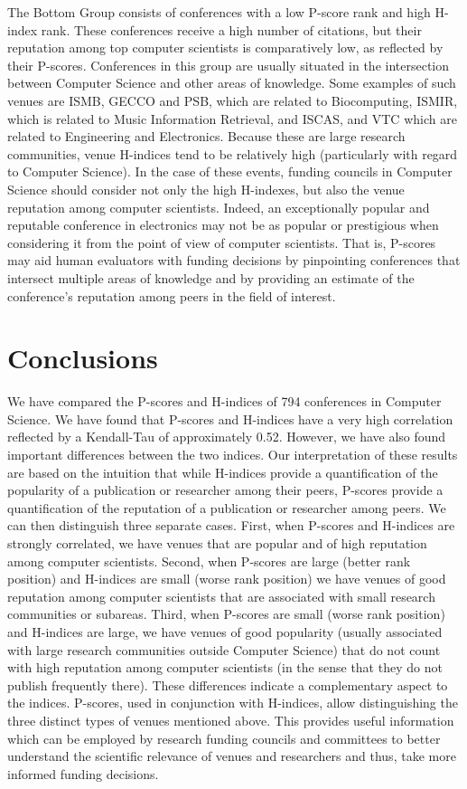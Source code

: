 \documentclass[notitlepage]{svjour3}
\begin{document}
The Bottom Group consists of conferences with a low P-score rank and high H-index rank. These conferences
receive a high number of citations, but their reputation among top computer scientists is comparatively low, as reflected by their P-scores. Conferences in this
group are usually situated in the intersection between Computer Science and other areas of knowledge. Some examples of such venues are
ISMB, GECCO and PSB, which are related to Biocomputing, ISMIR, which is related to Music Information Retrieval, and
ISCAS, and VTC which are related to Engineering and Electronics. Because these are large research communities, venue H-indices tend to be 
relatively high (particularly with regard to Computer Science). In the case of these events, funding councils in Computer Science should consider not only the high H-indexes, but also the venue reputation among computer
scientists. Indeed, an exceptionally popular and reputable conference in electronics may not be as 
popular or prestigious when considering it from the point of view of computer scientists. That is, P-scores may aid 
human evaluators with funding decisions by pinpointing conferences that intersect multiple areas of knowledge and by providing
an estimate of the conference's reputation among peers in the field of interest.


\section{Conclusions}
\label{sec:conclusions}

We have compared the P-scores and H-indices of 794 conferences in Computer Science. 
We have found that P-scores and H-indices have a very high correlation reflected by a Kendall-Tau of 
approximately 0.52. However,
we have also found important differences between the two indices.
Our interpretation of these results are based on the intuition that while H-indices provide a quantification of the popularity of a publication or researcher among their peers, P-scores provide a quantification of the reputation of a publication or researcher among peers. We can then distinguish three separate cases. First, when P-scores and H-indices are strongly correlated, we have venues that are popular and of high reputation among computer scientists. Second, when P-scores are large (better rank position) and H-indices are small (worse rank position) we have venues of good reputation among computer scientists that are associated with small research communities or subareas. Third, when P-scores are small (worse rank position) and H-indices are large, we have venues of good popularity (usually associated with large research communities outside Computer Science) that do not count with high reputation among computer scientists (in the sense that they do not publish frequently there).
These differences indicate a complementary aspect to the indices. P-scores, used in conjunction with H-indices, allow distinguishing the three distinct types of venues mentioned above. This provides useful information which
can be employed
by research funding councils and committees to better understand 
the scientific relevance of venues and researchers and thus, take more informed funding decisions.



\end{document}
